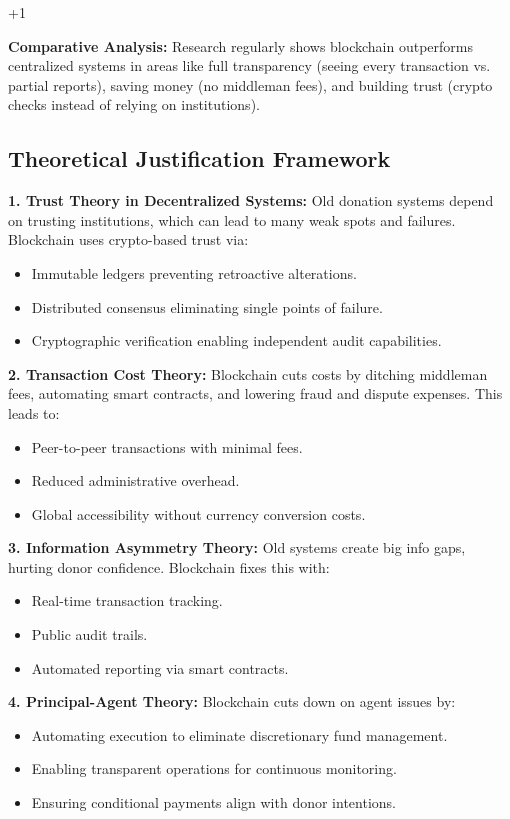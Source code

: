 +1\documentclass[conference]{IEEEtran}
\begin{document}
\textbf{Comparative Analysis:} Research regularly shows blockchain outperforms centralized systems in areas like full transparency (seeing every transaction vs. partial reports), saving money (no middleman fees), and building trust (crypto checks instead of relying on institutions).

\subsection{Theoretical Justification Framework}
\textbf{1. Trust Theory in Decentralized Systems:}
Old donation systems depend on trusting institutions, which can lead to many weak spots and failures. Blockchain uses crypto-based trust via:
\begin{itemize}
    \item Immutable ledgers preventing retroactive alterations.
    \item Distributed consensus eliminating single points of failure.
    \item Cryptographic verification enabling independent audit capabilities.
\end{itemize}

\textbf{2. Transaction Cost Theory:}
Blockchain cuts costs by ditching middleman fees, automating smart contracts, and lowering fraud and dispute expenses. This leads to:
\begin{itemize}
    \item Peer-to-peer transactions with minimal fees.
    \item Reduced administrative overhead.
    \item Global accessibility without currency conversion costs.
\end{itemize}

\textbf{3. Information Asymmetry Theory:}
Old systems create big info gaps, hurting donor confidence. Blockchain fixes this with:
\begin{itemize}
    \item Real-time transaction tracking.
    \item Public audit trails.
    \item Automated reporting via smart contracts.
\end{itemize}

\textbf{4. Principal-Agent Theory:}
Blockchain cuts down on agent issues by:
\begin{itemize}
    \item Automating execution to eliminate discretionary fund management.
    \item Enabling transparent operations for continuous monitoring.
    \item Ensuring conditional payments align with donor intentions.
\end{itemize}
\end{document}
